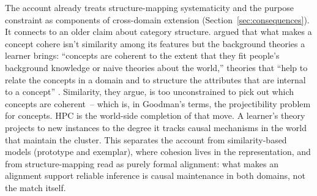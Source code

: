 The account already treats structure-mapping systematicity \citep{gentner1983} and the purpose constraint \citep{holyoak2018} as components of cross-domain extension (Section~\ref{sec:consequences}). It connects to an older claim about category structure. \textcite{murphymedin1985} argued that what makes a concept cohere isn't similarity among its features but the background theories a learner brings: \enquote{concepts are coherent to the extent that they fit people's background knowledge or naive theories about the world,} theories that \enquote{help to relate the concepts in a domain and to structure the attributes that are internal to a concept} \citep[289]{murphymedin1985}. Similarity, they argue, is too unconstrained to pick out which concepts are coherent~-- which is, in Goodman's terms, the projectibility problem for concepts. HPC is the world-side completion of that move. A learner's theory projects to new instances to the degree it tracks causal mechanisms in the world that maintain the cluster. This separates the account from similarity-based models (prototype and exemplar), where cohesion lives in the representation, and from structure-mapping read as purely formal alignment: what makes an alignment support reliable inference is causal maintenance in both domains, not the match itself.
